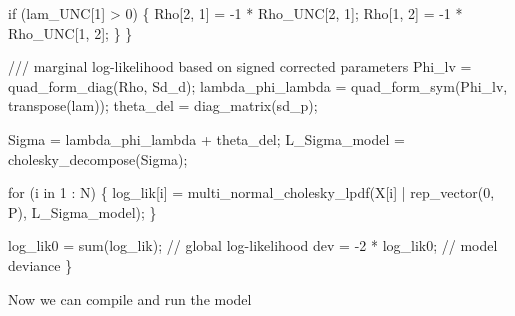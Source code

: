 \documentclass[
  letterpaper,
  DIV=11,
  numbers=noendperiod]{scrreprt}
\newenvironment{Shaded}{\begin{snugshade}}{\end{snugshade}}
\newcommand{\CommentTok}[1]{\textcolor[rgb]{0.37,0.37,0.37}{#1}}
\newcommand{\ControlFlowTok}[1]{\textcolor[rgb]{0.00,0.23,0.31}{#1}}
\newcommand{\DecValTok}[1]{\textcolor[rgb]{0.68,0.00,0.00}{#1}}
\newcommand{\NormalTok}[1]{\textcolor[rgb]{0.00,0.23,0.31}{#1}}
\begin{document}
\begin{Shaded}
\begin{Highlighting}[]
    \ControlFlowTok{if}\NormalTok{ (lam\_UNC[}\DecValTok{1}\NormalTok{] \textgreater{} }\DecValTok{0}\NormalTok{) \{}
\NormalTok{      Rho[}\DecValTok{2}\NormalTok{, }\DecValTok{1}\NormalTok{] = {-}}\DecValTok{1}\NormalTok{ * Rho\_UNC[}\DecValTok{2}\NormalTok{, }\DecValTok{1}\NormalTok{];}
\NormalTok{      Rho[}\DecValTok{1}\NormalTok{, }\DecValTok{2}\NormalTok{] = {-}}\DecValTok{1}\NormalTok{ * Rho\_UNC[}\DecValTok{1}\NormalTok{, }\DecValTok{2}\NormalTok{];}
\NormalTok{    \}}
\NormalTok{  \}}
  
  \CommentTok{/// marginal log{-}likelihood based on signed corrected parameters}
\NormalTok{  Phi\_lv = quad\_form\_diag(Rho, Sd\_d);}
\NormalTok{  lambda\_phi\_lambda = quad\_form\_sym(Phi\_lv, transpose(lam));}
\NormalTok{  theta\_del = diag\_matrix(sd\_p);}
  
\NormalTok{  Sigma = lambda\_phi\_lambda + theta\_del;}
\NormalTok{  L\_Sigma\_model = cholesky\_decompose(Sigma);}
  
  \ControlFlowTok{for}\NormalTok{ (i }\ControlFlowTok{in} \DecValTok{1}\NormalTok{ : N) \{}
\NormalTok{    log\_lik[i] = multi\_normal\_cholesky\_lpdf(X[i] | rep\_vector(}\DecValTok{0}\NormalTok{, P), L\_Sigma\_model);}
\NormalTok{  \}}
  
\NormalTok{  log\_lik0 = sum(log\_lik); }\CommentTok{// global log{-}likelihood}
\NormalTok{  dev = {-}}\DecValTok{2}\NormalTok{ * log\_lik0; }\CommentTok{// model deviance}
\NormalTok{\}}
\end{Highlighting}
\end{Shaded}

Now we can compile and run the model
\end{document}
